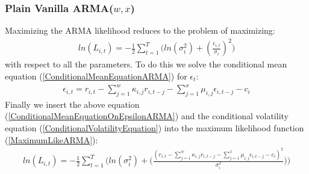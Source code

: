 \subsubsection{Plain Vanilla ARMA($w,x$)}
Maximizing the ARMA likelihood reduces to the problem of maximizing:
\begin{align} 
    ln(L_{i,t})=-\frac{1}{2}\sum_{t=1}^T\bigg( ln(\sigma_{i}^2)+(\frac{\epsilon_{i,t}}{\sigma_i})^2\bigg)  \label{MaximumLikeARMA}
\end{align}
with respect to all the parameters. To do this we solve the conditional mean equation (\ref{ConditionalMeanEquationARMA}) for $\epsilon_t$:
\begin{align}
     \epsilon_{i,t}=r_{i,t}-\sum_{j=1}^w\kappa_{i,j} r_{i,t-j}-\sum_{j=1}^x\mu_{i,j} \epsilon_{i,t-j}-c_i \label{ConditionalMeanEquationOnEpsilon}
\end{align}
Finally we insert the above equation (\ref{ConditionalMeanEquationOnEpsilonARMA}) and the conditional volatility equation (\ref{ConditionalVolatilityEquation}) into the maximum likelihood function (\ref{MaximumLikeARMA}):
\begin{align} 
    ln(L_{i,t})=-\frac{1}{2}\sum_{t=1}^T\Bigg( ln(\sigma_i^2)+\Big(\frac{(r_{i,t}-\sum_{j=1}^w\kappa_{i,j} r_{i,t-j}-\sum_{j=1}^x\mu_{i,j} \epsilon_{i,t-j}-c_i)^2}{\sigma_i^2}\Big)\Bigg)  \label{fullMaximumLikeARMA}
\end{align}

